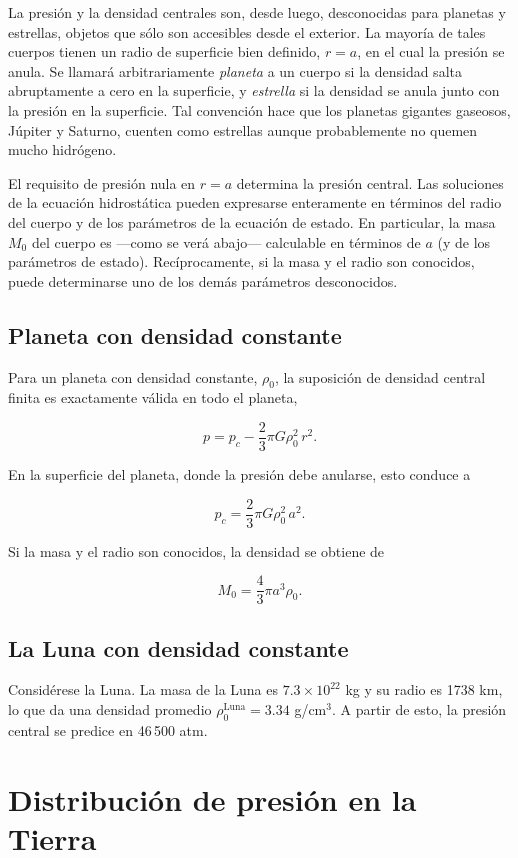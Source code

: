 La presión y la densidad centrales son, desde luego, desconocidas para planetas y estrellas, objetos que sólo son accesibles desde el exterior. La mayoría de tales cuerpos tienen un radio de superficie bien definido, $r = a$, en el cual la presión se anula. Se llamará arbitrariamente \emph{planeta} a un cuerpo si la densidad salta abruptamente a cero en la superficie, y \emph{estrella} si la densidad se anula junto con la presión en la superficie. Tal convención hace que los planetas gigantes gaseosos, Júpiter y Saturno, cuenten como estrellas aunque probablemente no quemen mucho hidrógeno.

El requisito de presión nula en $r = a$ determina la presión central. Las soluciones de la ecuación hidrostática pueden expresarse enteramente en términos del radio del cuerpo y de los parámetros de la ecuación de estado. En particular, la masa $M_0$ del cuerpo es —como se verá abajo— calculable en términos de $a$ (y de los parámetros de estado). Recíprocamente, si la masa y el radio son conocidos, puede determinarse uno de los demás parámetros desconocidos.

\subsection{Planeta con densidad constante}

Para un planeta con densidad constante, $\rho_0$, la suposición de densidad central finita es exactamente válida en todo el planeta,

$$ p = p_c - \frac{2}{3}\pi G \rho_0^2\, r^2. $$

En la superficie del planeta, donde la presión debe anularse, esto conduce a

$$ p_c = \frac{2}{3}\pi G \rho_0^2\, a^2. $$

Si la masa y el radio son conocidos, la densidad se obtiene de

$$ M_0 = \frac{4}{3}\pi a^3 \rho_0. $$

\subsection{La Luna con densidad constante}

Considérese la Luna. La masa de la Luna es $7.3 \times 10^{22}$ kg y su radio es 1738 km, lo que da una densidad promedio $\rho_0^{\mathrm{Luna}} = 3.34$ g/cm$^3$. A partir de esto, la presión central se predice en 46\,500 atm.

\section{Distribución de presión en la Tierra}

